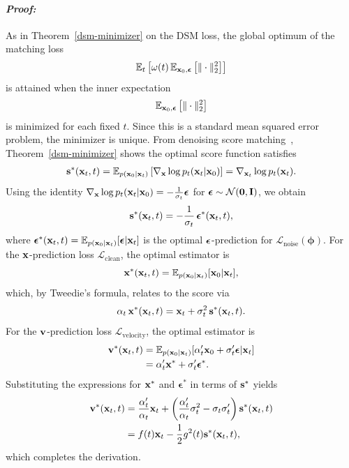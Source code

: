 \paragraph{\textit{Proof:}} 
As in Theorem~\ref{dsm-minimizer} on the DSM loss, the global optimum of the matching loss
\[
\mathbb{E}_t\left[\omega(t)\,\mathbb{E}_{{\mathbf{x}}_0,\bm{\epsilon}}\left[\|\cdot\|_2^2\right]\right]
\]
is attained when the inner expectation
\[
\mathbb{E}_{{\mathbf{x}}_0,\bm{\epsilon}}\left[\|\cdot\|_2^2\right]
\]
is minimized for each fixed $t$. Since this is a standard mean squared error problem, the minimizer is unique.
From denoising score matching~\citep{vincent2011connection}, Theorem~\ref{dsm-minimizer} shows the optimal score function satisfies
\begin{align*}
    {\mathbf{s}}^*({\mathbf{x}}_t,t) = \mathbb{E}_{p({\mathbf{x}}_0|{\mathbf{x}}_t)}\left[\nabla_{{\mathbf{x}}}\log p_t({\mathbf{x}}_t|{\mathbf{x}}_0)\right] = \nabla_{{\mathbf{x}}_t} \log p_t({\mathbf{x}}_t).
\end{align*}
Using the identity $\nabla_{{\mathbf{x}}}\log p_t({\mathbf{x}}_t|{\mathbf{x}}_0) = -\frac{1}{\sigma_t} \bm{\epsilon}$ for $\bm{\epsilon} \sim \mathcal{N}(\bm{0},{\mathbf{I}})$, we obtain
\begin{align*}
    {\mathbf{s}}^*({\mathbf{x}}_t,t) = -\frac{1}{\sigma_t}\, \bm{\epsilon}^*({\mathbf{x}}_t,t),
\end{align*}
where $\bm{\epsilon}^*({\mathbf{x}}_t,t) = \mathbb{E}_{p({\mathbf{x}}_0|{\mathbf{x}}_t)}[\bm{\epsilon}|{\mathbf{x}}_t]$ is the optimal ${\bm{\epsilon}}$-prediction for $\mathcal{L}_{\text{noise}}({\bm{\phi}})$.
For the ${\mathbf{x}}$-prediction loss $\mathcal{L}_{\text{clean}}$, the optimal estimator is
\[
{\mathbf{x}}^*({\mathbf{x}}_t,t) = \mathbb{E}_{p({\mathbf{x}}_0|{\mathbf{x}}_t)}[{\mathbf{x}}_0|{\mathbf{x}}_t],
\]
which, by Tweedie's formula, relates to the score via
\[
\alpha_t\, {\mathbf{x}}^*({\mathbf{x}}_t,t) = {\mathbf{x}}_t + \sigma_t^2\, {\mathbf{s}}^*({\mathbf{x}}_t,t).
\]
For the ${\mathbf{v}}$-prediction loss $\mathcal{L}_{\text{velocity}}$, the optimal estimator is
\begin{align*}
    {\mathbf{v}}^*({\mathbf{x}}_t,t) &= \mathbb{E}_{p({\mathbf{x}}_0|{\mathbf{x}}_t)}[\alpha_t' {\mathbf{x}}_0 + \sigma_t' \bm{\epsilon}|{\mathbf{x}}_t] \\
    &= \alpha_t' {\mathbf{x}}^* + \sigma_t' \bm{\epsilon}^*.
\end{align*}
Substituting the expressions for ${\mathbf{x}}^*$ and $\bm{\epsilon}^*$ in terms of ${\mathbf{s}}^*$ yields
\begin{align*}
    {\mathbf{v}}^*({\mathbf{x}}_t,t)
    &= \frac{\alpha_t'}{\alpha_t} {\mathbf{x}}_t + \left( \frac{\alpha_t'}{\alpha_t} \sigma_t^2 - \sigma_t \sigma_t' \right) {\mathbf{s}}^*({\mathbf{x}}_t,t) \\
    &= f(t) {\mathbf{x}}_t - \frac{1}{2}g^2(t) {\mathbf{s}}^*({\mathbf{x}}_t,t),
\end{align*}
which completes the derivation.



